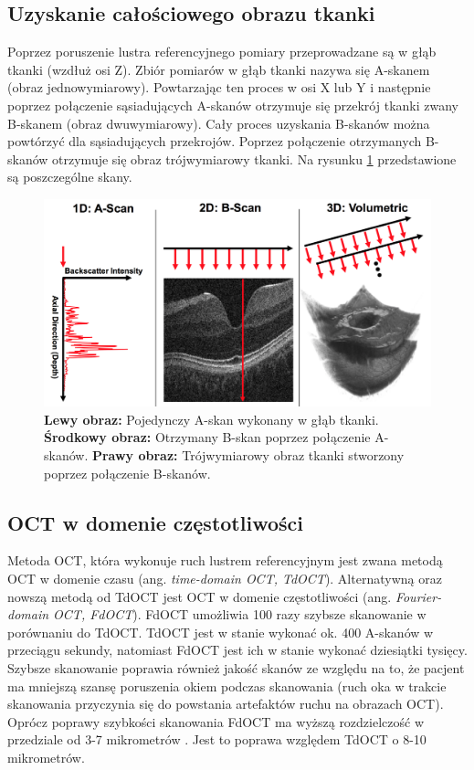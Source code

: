 \subsection{Uzyskanie całościowego obrazu tkanki}

Poprzez poruszenie lustra referencyjnego pomiary przeprowadzane są w głąb tkanki (wzdłuż osi Z). Zbiór pomiarów w głąb tkanki nazywa się A-skanem (obraz jednowymiarowy). Powtarzając ten proces w osi X lub Y i następnie poprzez połączenie sąsiadujących A-skanów otrzymuje się przekrój tkanki zwany B-skanem (obraz dwuwymiarowy). Cały proces uzyskania B-skanów można powtórzyć dla sąsiadujących przekrojów. Poprzez połączenie otrzymanych B-skanów otrzymuje się obraz trójwymiarowy tkanki. Na rysunku \ref{fig:obrazowanie_oct:scan} \cite{Kraus:12} przedstawione są poszczególne skany.

\begin{figure}[htb]
	\centering
	\includegraphics[width=\textwidth]{gfx/scans}
	\caption{\cite{Kraus:12} \textbf{Lewy obraz:} Pojedynczy A-skan wykonany w głąb tkanki. \textbf{Środkowy obraz:} Otrzymany B-skan poprzez połączenie A-skanów. \textbf{Prawy obraz:} Trójwymiarowy obraz tkanki stworzony poprzez połączenie B-skanów.}
	\label{fig:obrazowanie_oct:scan}
\end{figure}

\subsection{OCT w domenie częstotliwości}

Metoda OCT, która wykonuje ruch lustrem referencyjnym jest zwana metodą OCT w domenie czasu (ang. \textit{time-domain OCT, TdOCT}). Alternatywną oraz nowszą metodą od TdOCT jest OCT w domenie częstotliwości (ang. \textit{Fourier-domain OCT, FdOCT}). FdOCT umożliwia 100 razy szybsze \cite{Strong:11} skanowanie w porównaniu do TdOCT. TdOCT jest w stanie wykonać ok. 400 A-skanów w przeciągu sekundy, natomiast FdOCT jest ich w stanie wykonać dziesiątki tysięcy. Szybsze skanowanie poprawia również jakość skanów ze względu na to, że pacjent ma mniejszą szansę poruszenia okiem podczas skanowania (ruch oka w trakcie skanowania przyczynia się do powstania artefaktów ruchu na obrazach OCT). Oprócz poprawy szybkości skanowania FdOCT ma wyższą rozdzielczość w przedziale od 3-7 mikrometrów \cite{Strong:11}. Jest to poprawa względem TdOCT o 8-10 mikrometrów.

